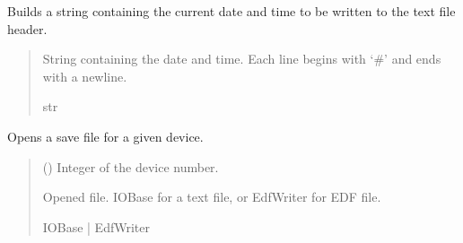 \documentclass[letterpaper,10pt,english]{sphinxmanual}
\begin{document}
\begin{fulllineitems}
\begin{fulllineitems}
\label{\detokenize{Setup.SetupOneDevice:Setup.SetupOneDevice.Setup_PodInterface.SetupInterface._GetTimeHeader_forTXT}}
\pysigstartsignatures
{}
\pysigstopsignatures
\sphinxAtStartPar
Builds a string containing the current date and time to be written to the text file header.
\begin{quote}\begin{description}
\sphinxAtStartPar
String containing the date and time. Each line begins with ‘\#’ and ends with a newline.

\sphinxAtStartPar
str

\end{description}\end{quote}

\end{fulllineitems}


\begin{fulllineitems}
\label{\detokenize{Setup.SetupOneDevice:Setup.SetupOneDevice.Setup_PodInterface.SetupInterface._OpenSaveFile}}
\pysigstartsignatures
{}
\pysigstopsignatures
\sphinxAtStartPar
Opens a save file for a given device.
\begin{quote}\begin{description}
\sphinxAtStartPar
{} () \textendash{} Integer of the device number.

\sphinxAtStartPar
Opened file. IOBase for a text file, or EdfWriter for EDF file.

\sphinxAtStartPar
IOBase | EdfWriter

\end{description}\end{quote}


\end{fulllineitems}
\end{fulllineitems}
\end{document}
